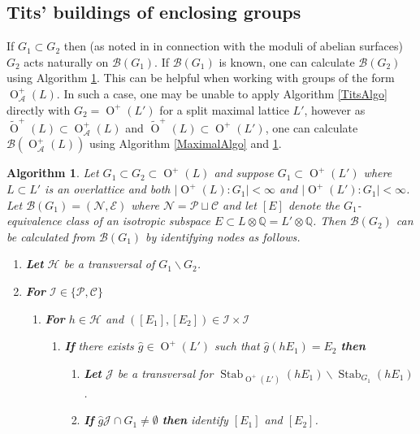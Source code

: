 \documentclass[12pt, a4paper]{article}
\newtheorem{algo}{Algorithm}[section]
\newcommand{\QQ}{\mathbb{Q}}
\newcommand{\Ac}{\mathcal{A}}
\newcommand{\bc}{\mathcal{B}}
\newcommand{\cc}{\mathcal{C}}
\newcommand{\ec}{\mathcal{E}}
\newcommand{\hc}{\mathcal{H}}
\newcommand{\ic}{\mathcal{I}}
\newcommand{\jc}{\mathcal{J}}
\newcommand{\nc}{\mathcal{N}}
\newcommand{\pc}{\mathcal{P}}
\newcommand{\opn}{\operatorname}
\newcommand{\otl}{\widetilde{\opn{O}}^+(L)}
\begin{document}
\subsection{Tits' buildings of enclosing groups}
If $G_1 \subset G_2$ then (as noted in \cite{abeliancompact} in connection with the moduli of abelian surfaces) $G_2$ acts naturally on $\bc(G_1)$.
If $\bc(G_1)$ is known, one can calculate $\bc(G_2)$ using Algorithm \ref{SuperGroupAlg}.
This can be helpful when working with groups of the form $\opn{O}_{\Ac}^+(L)$.
In such a case, one may be unable to apply Algorithm \ref{TitsAlgo} directly with $G_2=\opn{O}^+(L')$ for a split maximal lattice $L'$, however as $\otl \subset \opn{O}_{\Ac}^+(L)$ and $\otl \subset \opn{O}^+(L')$, one can calculate $\bc(\opn{O}_{\Ac}^+(L))$ using Algorithm \ref{MaximalAlgo} and \ref{SuperGroupAlg}.
\begin{algo}\label{SuperGroupAlg}
  Let
  $G_1 \subset G_2 \subset \opn{O}^+(L)$ and suppose $G_1 \subset \opn{O}^+(L')$ where $L \subset L'$ is an overlattice and both $\vert \opn{O}^+(L):G_1 \vert < \infty$ and
  $\vert \opn{O}^+(L'):G_1\vert < \infty$.
  Let $\bc(G_1) = (\nc, \ec)$ where $\nc = \pc \sqcup \cc$ and let $[E]$ denote the $G_1$-equivalence class of an isotropic subspace $E \subset L \otimes \QQ = L' \otimes \QQ$. 
Then $\bc(G_2)$ can be calculated from $\bc(G_1)$ by identifying nodes as follows.
  \begin{enumerate}
  \item \textbf{Let} $\hc$ be a transversal of $G_1 \backslash G_2$.
  \item \textbf{For} $\ic \in \{\pc, \cc\}$ 
      \begin{enumerate}
      \item[] \textbf{For} $h \in \hc$ and $([E_1], [E_2]) \in \ic \times \ic$
        \begin{enumerate}
        \item[] \textbf{If} there exists $\hat{g} \in \opn{O}^+(L')$ such that $\hat{g}(hE_1) = E_2$ \textbf{then} 
          \begin{enumerate}
          \item[] \textbf{Let} $\jc$ be a transversal for $\opn{Stab}_{\opn{O}^+(L')}(h E_1) \backslash \opn{Stab}_{G_1}(h E_1)$.
          \item[] \textbf{If} $\hat{g} \jc \cap G_1 \neq \emptyset$ \textbf{then} identify $[E_1]$ and $[E_2]$.
          \end{enumerate}
        \end{enumerate}
      \end{enumerate}
  \end{enumerate}
\end{algo}
\end{document}
